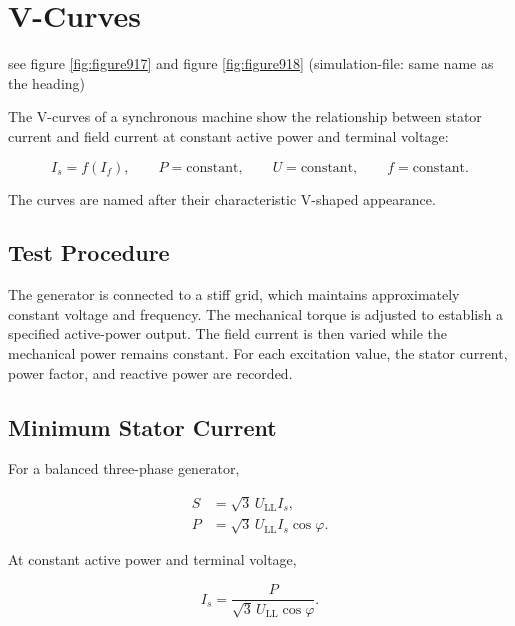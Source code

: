 \section{V-Curves} see figure \ref{fig:figure917} and figure \ref{fig:figure918}  (simulation-file: same name as the heading) 
\label{sec:sg-v-curves}

The V-curves of a synchronous machine show the relationship between stator
current and field current at constant active power and terminal voltage:

\begin{equation}
  I_s=f(I_f),
  \qquad
  P=\text{constant},
  \qquad
  U=\text{constant},
  \qquad
  f=\text{constant}.
  \label{eq:sg-v-curve-definition}
\end{equation}

The curves are named after their characteristic V-shaped appearance.

\subsection{Test Procedure}

The generator is connected to a stiff grid, which maintains approximately
constant voltage and frequency. The mechanical torque is adjusted to establish
a specified active-power output. The field current is then varied while the
mechanical power remains constant. For each excitation value, the stator
current, power factor, and reactive power are recorded.

\subsection{Minimum Stator Current}

For a balanced three-phase generator,

\begin{align}
  S &= \sqrt{3}\,U_{\mathrm{LL}}I_s, \\
  P &= \sqrt{3}\,U_{\mathrm{LL}}I_s\cos\varphi.
\end{align}

At constant active power and terminal voltage,

\begin{equation}
  I_s
  =\frac{P}{\sqrt{3}\,U_{\mathrm{LL}}\cos\varphi}.
  \label{eq:sg-v-curve-current}
\end{equation}

